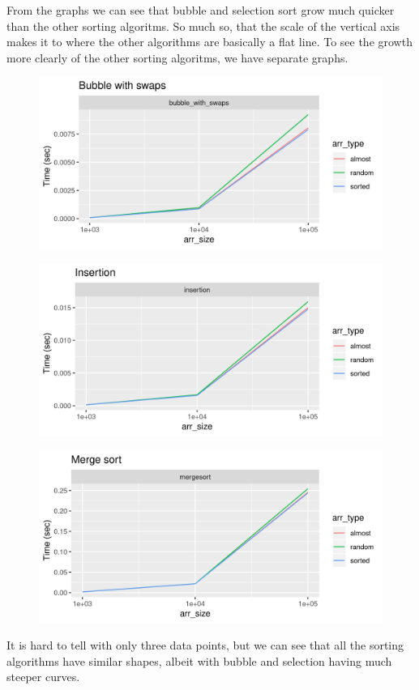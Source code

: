 \documentclass[letterpaper, 11pt]{article}
\begin{document}
From the graphs we can see that bubble and selection sort grow much
quicker than the other sorting algoritms. So much so, that the scale of the
vertical axis makes it to where the other algorithms are basically a flat line.
To see the growth more clearly of the other sorting algoritms, we have separate
graphs. 

\begin{figure}[ht]
  \includegraphics[width=\linewidth]{bubble_with_swaps.png}
\end{figure}

\begin{figure}[ht]
  \includegraphics[width=\linewidth]{insertion.png}
\end{figure}

\begin{figure}[ht]
  \includegraphics[width=\linewidth]{mergesort.png}
\end{figure}

It is hard to tell with only three data points, but we can see that all the
sorting algorithms have similar shapes, albeit with bubble and selection having
much steeper curves. 
\end{document}
